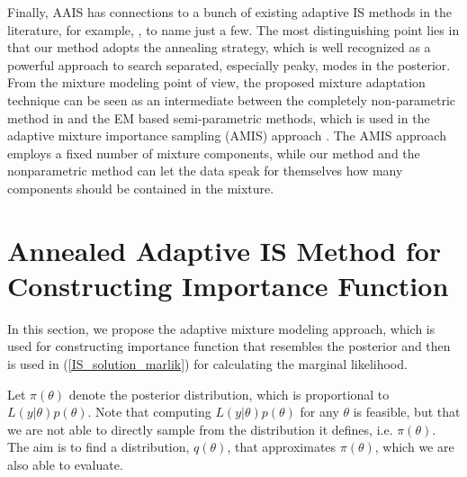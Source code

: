 Finally, AAIS has connections to a bunch of existing adaptive IS
methods in the literature, for example,
\cite{evans1991chaining,oh1993imf,cappe2008ais,cappe2004pmc,west1993mixture,ardia2008adaptive},
to name just a few. The most distinguishing point lies in that our
method adopts the annealing strategy, which is well recognized as a
powerful approach to search separated, especially peaky, modes in
the posterior. From the mixture modeling point of view, the proposed
mixture adaptation technique can be seen as an intermediate between
the completely non-parametric method in \cite{west1993mixture} and
the EM based semi-parametric methods, which is used in the adaptive
mixture importance sampling (AMIS) approach \citep{cappe2008ais}.
The AMIS approach employs a fixed number of mixture components,
while our method and the nonparametric method
\citep{west1993mixture} can let the data speak for themselves how
many components should be contained in the mixture.

\section{Annealed Adaptive IS Method for Constructing Importance
  Function} \label{sec:AAIS}
In this section, we propose the adaptive mixture modeling approach,
which is used for constructing importance function that resembles
the posterior and then is used in (\ref{IS_solution_marlik}) for
calculating the marginal likelihood.

Let $\pi(\theta)$ denote the posterior distribution, which is
proportional to $L(y|\theta)p(\theta)$. Note that computing
$L(y|\theta)p(\theta)$ for any $\theta$ is feasible, but that we are
not able to directly sample from the distribution it defines, i.e.
$\pi(\theta)$. The aim is to find a distribution, $q(\theta)$, that
approximates $\pi(\theta)$, which we are also able to evaluate.

